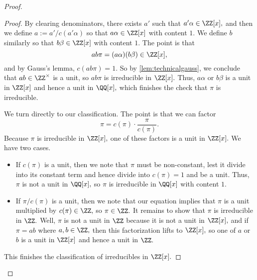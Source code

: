 \documentclass[../notes.tex]{subfiles}
\begin{document}
\begin{proof}
\begin{proof}
		By clearing denominators, there exists $a'$ such that $a'\alpha\in\ZZ[x],$ and then we define $a:=a'/c(a'\alpha)$ so that $a\alpha\in\ZZ[x]$ with content $1.$ We define $b$ similarly so that $b\beta\in\ZZ[x]$ with content $1.$ The point is that
		\[ab\pi=(a\alpha)(b\beta)\in\ZZ[x],\]
		and by Gauss's lemma, $c(ab\pi)=1.$ So by \autoref{lem:technicalgauss}, we conclude that $ab\in\ZZ^\times$ is a unit, so $ab\pi$ is irreducible in $\ZZ[x].$ Thus, $a\alpha$ or $b\beta$ is a unit in $\ZZ[x]$ and hence a unit in $\QQ[x],$ which finishes the check that $\pi$ is irreducible.
		
		We turn directly to our classification. The point is that we can factor
		\[\pi=c(\pi)\cdot\frac{\pi}{c(\pi)}.\]
		Because $\pi$ is irreducible in $\ZZ[x],$ one of these factors is a unit in $\ZZ[x].$ We have two cases.
		\begin{itemize}
			\item If $c(\pi)$ is a unit, then we note that $\pi$ must be non-constant, lest it divide into its constant term and hence divide into $c(\pi)=1$ and be a unit. Thus, $\pi$ is not a unit in $\QQ[x],$ so $\pi$ is irreducible in $\QQ[x]$ with content $1.$
			\item If $\pi/c(\pi)$ is a unit, then we note that our equation implies that $\pi$ is a unit multiplied by $c(\pi)\in\ZZ,$ so $\pi\in\ZZ.$ It remains to show that $\pi$ is irreducible in $\ZZ.$ Well, $\pi$ is not a unit in $\ZZ$ because it is not a unit in $\ZZ[x],$ and if $\pi=ab$ where $a,b\in\ZZ,$ then this factorization lifts to $\ZZ[x],$ so one of $a$ or $b$ is a unit in $\ZZ[x]$ and hence a unit in $\ZZ.$
		\end{itemize}
		This finishes the classification of irreducibles in $\ZZ[x].$


\end{proof}
\end{proof}
\end{document}
